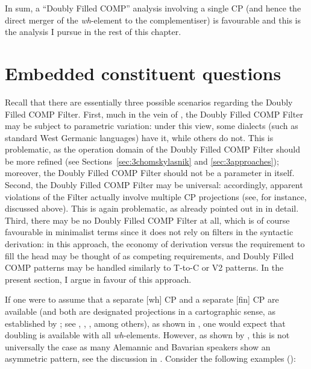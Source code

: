 In sum, a ``Doubly Filled COMP'' analysis involving a single CP (and hence the direct merger of the \textit{wh}-element to the complementiser) is favourable and this is the analysis I pursue in the rest of this chapter.

\section{Embedded constituent questions} \label{sec:3embedded}
Recall that there are essentially three possible scenarios regarding the Doubly Filled COMP Filter. First, much in the vein of \citet{chomskylasnik1977}, the Doubly Filled COMP Filter may be subject to parametric variation: under this view, some dialects (such as standard West Germanic languages) have it, while others do not. This is problematic, as the operation domain of the Doubly Filled COMP Filter should be more refined (see Sections~\ref{sec:3chomskylasnik} and \ref{sec:3approaches}); moreover, the Doubly Filled COMP Filter should not be a parameter in itself. Second, the Doubly Filled COMP Filter may be universal: accordingly, apparent violations of the Filter actually involve multiple CP projections (see, for instance, \citealt{baltin2010} discussed above). This is again problematic, as already pointed out in  in detail. Third, there may be no Doubly Filled COMP Filter at all, which is of course favourable in minimalist terms since it does not rely on filters in the syntactic derivation: in this approach, the economy of derivation versus the requirement to fill the head may be thought of as competing requirements, and Doubly Filled COMP patterns may be handled similarly to T-to-C or V2 patterns. In the present section, I argue in favour of this approach.

If one were to assume that a separate [wh] CP and a separate [fin] CP are available (and both are designated projections in a cartographic sense, as established by \citealt{rizzi1997}; see \citealt{grewendorf2002, grewendorf2008}, \citealt{frey2004, frey2005}, \citealt{bayer2004, bayer2006}, among others), as shown in , one would expect that doubling is available with all \textit{wh}-elements. However, as shown by \citet{bayerbrandner2008}, this is not universally the case as many Alemannic and Bavarian speakers show an asymmetric pattern, see the discussion in . Consider the following examples (\citealt[88, ex. 3a, 4a, 5a and 5b]{bayerbrandner2008}):\largerpage

